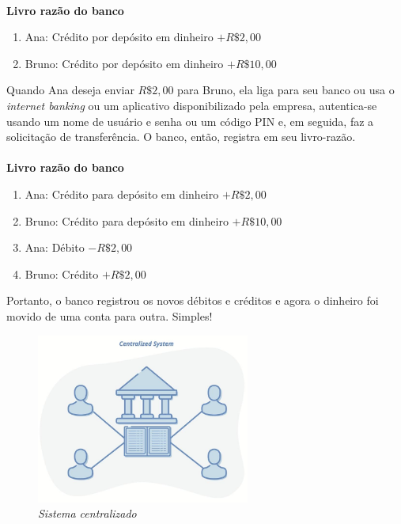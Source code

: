 \paragraph{}
\textbf{Livro razão do banco}

\begin{samepage}
\begin{enumerate}
\item Ana: Crédito por depósito em dinheiro $+R\$2,00$ 
\item Bruno: Crédito por depósito em dinheiro $+R\$10,00$
\end{enumerate}
\end{samepage}

Quando Ana deseja enviar $R\$2,00$ para Bruno, ela liga para seu banco ou usa o \textit{internet banking} ou um aplicativo disponibilizado pela empresa, autentica-se usando um nome de usuário e senha ou um código PIN e, em seguida, faz a solicitação de transferência. O banco, então, registra em seu livro-razão.

\paragraph{}
\textbf{Livro razão do banco}

\begin{samepage}
\begin{enumerate}
\item Ana: Crédito para depósito em dinheiro $+R\$2,00$
\item Bruno: Crédito para depósito em dinheiro $+R\$10,00$
\item Ana: Débito $-R\$2,00$
\item Bruno: Crédito $+R\$2,00$
\end{enumerate}
\end{samepage}

Portanto, o banco registrou os novos débitos e créditos e agora o dinheiro foi movido de uma conta para outra. Simples!
\begin{figure}
  \centering
  \includegraphics[width=7cm]{imagens/centralizado-capitulo-02.jpg}
  \caption*{\textit{\small Sistema centralizado}}
\end{figure}


